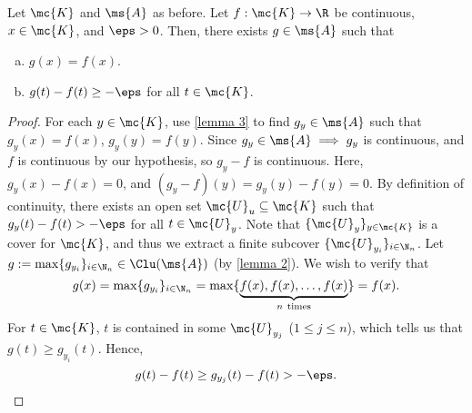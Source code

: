 \begin{lemma}
    Let \(\mc{K}\) and \(\ms{A}\) as before. Let \(f:\mc{K}\to\R\) be continuous, \(x\in\mc{K}\), and \(\eps>0\). Then, there exists \(g\in\ms{A}\) such that 
    \begin{enumerate}[(a)]
        \item \(g(x)=f(x)\).
        
        \item \(g(t)-f(t)\geq -\eps\) for all \(t\in\mc{K}\). 
    \end{enumerate}
    \label{lemma 4}
\end{lemma}
\begin{proof}
    For each \(y\in\mc{K}\), use \cref{lemma 3} to find \(g_y\in\ms{A}\) such that \(g_y(x)=f(x)\), \(g_y(y)=f(y)\). Since \(g_y\in\ms{A}\implies g_y\) is continuous, and \(f\) is continuous by our hypothesis, so \(g_y-f\) is continuous. Here, \(g_y(x)-f(x)=0\), and \((g_y-f)(y)=g_y(y)-f(y)=0\). By definition of continuity, there exists an open set \(\mc{U}_u\subseteq\mc{K}\) such that \(g_y(t)-f(t)>-\eps\) for all \(t\in\mc{U}_y\). Note that \(\{\mc{U}_y\}_{y\in\mc{K}}\) is a cover for \(\mc{K}\), and thus we extract a finite subcover \(\{\mc{U}_{y_{i}}\}_{i\in\N_n}\). Let \(g:=\max\{g_{y_i}\}_{i\in\N_n}\in\Clu(\ms{A})\) (by \cref{lemma 2}). We wish to verify that 
    \begin{equation*} 
        g(x)=\max\{g_{y_i}\}_{i\in\N_n}=\max\{\underbrace{f(x),f(x),\dots,f(x)}_{n~\text{times}}\}=f(x).
    \end{equation*}
    For \(t\in\mc{K}\), \(t\) is contained in some \(\mc{U}_{y_j}\) (\(1\leq j\leq n\)), which tells us that \(g(t)\geq g_{y_i}(t)\). Hence, 
    \begin{equation*} 
        g(t)-f(t)\geq g_{y_j}(t)-f(t)>-\eps.
    \end{equation*}
\end{proof}

